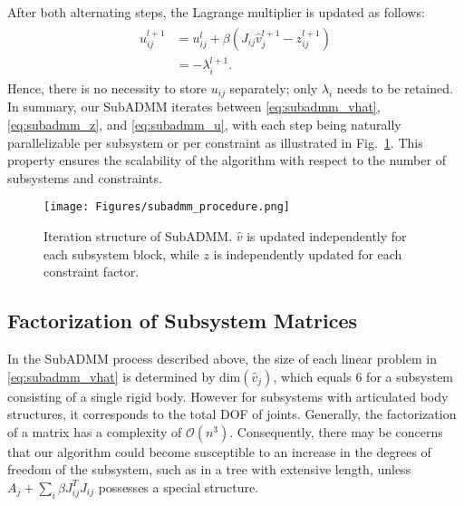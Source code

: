 \documentclass[lettersize,journal]{IEEEtran}
\begin{document}
After both alternating steps, the Lagrange multiplier is updated as follows:
\begin{align} \label{eq:subadmm_u}
\begin{split}
    u_{ij}^{l+1} 
    &= u_{ij}^l + \beta (J_{ij}\hat{v}_j^{l+1} - z_{ij}^{l+1}) \\
    &=-\lambda_i^{l+1}.
\end{split}
\end{align}
Hence, there is no necessity to store $u_{ij}$ separately; only $\lambda_i$ needs to be retained.
In summary, our SubADMM iterates between \eqref{eq:subadmm_vhat}, \eqref{eq:subadmm_z}, and \eqref{eq:subadmm_u}, with each step being naturally parallelizable per subsystem or per constraint as illustrated in Fig.~\ref{fig:subadmm_procedure}. This property ensures the scalability of the algorithm with respect to the number of subsystems and constraints. 

\begin{figure}[t]
\centering
\texttt{[image: Figures/subadmm\_procedure.png]}
\caption{Iteration structure of SubADMM. $\hat{v}$ is updated independently for each subsystem block, while $z$ is independently updated for each constraint factor.}
\label{fig:subadmm_procedure}
\end{figure}

\subsection{Factorization of Subsystem Matrices} \label{subsec:submatrix_factor}

In the SubADMM process described above, the size of each linear problem in \eqref{eq:subadmm_vhat} is determined by $\text{dim}(\hat{v}_j)$, which equals 6 for a subsystem consisting of a single rigid body. 
However for subsystems with articulated body structures, it corresponds to the total DOF of joints.
Generally, the factorization of a matrix has a complexity of $\mathcal{O}(n^3)$. Consequently, there may be concerns that our algorithm could become susceptible to an increase in the degrees of freedom of the subsystem, such as in a tree with extensive length, unless $A_j + \sum_{i} \beta J_{ij}^T J_{ij}$ possesses a special structure.
\end{document}
